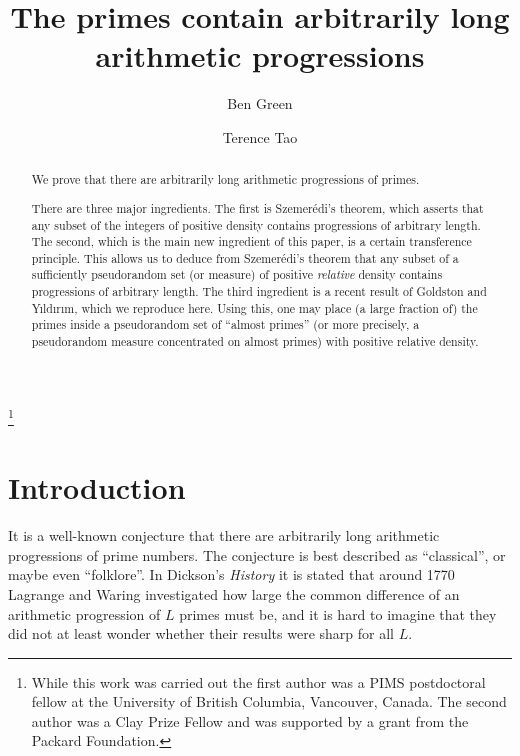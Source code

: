 \documentclass[12pt,a4paper,reqno]{amsart}
\numberwithin{equation}{section}
\theoremstyle{plain}
\theoremstyle{definition}
\def\vs{\vspace{11pt}}
\def\ni{\noindent}
\def\emph#1{{\it #1}}
\begin{document}
\title{The primes contain arbitrarily long arithmetic progressions}

\author{Ben Green}
\address{School of Mathematics\\
University Walk\\
Bristol\\
BS8 1TW
}

\author{Terence Tao}
\address{Department of Mathematics\\University of California at Los Angeles\\ Los Angeles CA 90095}


\thanks{While this work was carried out the first author was a PIMS postdoctoral fellow at the University of British Columbia, Vancouver, Canada.  The second author was
a Clay Prize Fellow and was supported by a grant from the Packard Foundation.}


\begin{abstract}
We prove that there are arbitrarily long arithmetic progressions of primes.\vs  

\ni There are three
major ingredients.  The first is Szemer\'edi's theorem, which asserts that any subset of the integers of positive density 
contains progressions of arbitrary length.  The second, which is the main new ingredient of this paper,
is a certain transference principle. This allows us to deduce from Szemer\'edi's theorem that any subset of a sufficiently 
pseudorandom set (or measure) of positive \emph{relative} density 
contains progressions of arbitrary length.  The third ingredient is a recent result of Goldston
and Y{\i}ld{\i}r{\i}m, which we reproduce here. Using this, one may place (a large fraction of) the primes 
inside a pseudorandom set of ``almost primes'' (or more precisely, a pseudorandom measure concentrated on almost primes)
with positive relative density. 
\end{abstract}


\maketitle


\section{Introduction}
     
\ni It is a well-known conjecture that there are arbitrarily long arithmetic progressions of prime numbers. The conjecture is best described as ``classical'', or maybe even ``folklore''. In Dickson's \textit{History} it is stated that around 1770 Lagrange and Waring investigated how large the common difference of an arithmetic progression of $L$ primes must be, and it is hard to imagine that they did not at least wonder whether their results were sharp for all $L$.\vs
\end{document}
